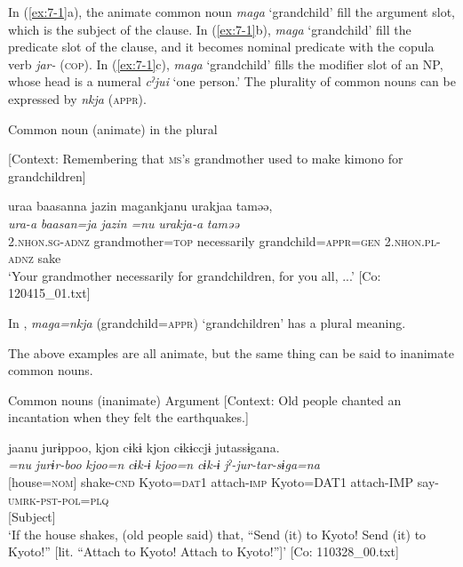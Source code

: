 \z
\z

In (\ref{ex:7-1}a), the animate common noun \textit{maga} ‘grandchild’ fill the argument slot, which is the subject of the clause. In (\ref{ex:7-1}b), \textit{maga} ‘grandchild’ fill the predicate slot of the clause, and it becomes nominal predicate with the copula verb \textit{jar-} (\textsc{cop}). In (\ref{ex:7-1}c), \textit{maga} ‘grandchild’ fills the modifier slot of an NP, whose head is a numeral \textit{cˀjui} ‘one person.’ The plurality of common nouns can be expressed by \textit{nkja} (\textsc{appr}).

\ea \label{ex:7:2}  Common noun (animate) in the plural

  [Context: Remembering that \textsc{ms}’s grandmother used to make kimono for grandchildren]

{\TM}
\glll uraa  baasanna  jazin  magankjanu urakjaa  taməə,\\
\textit{ura-a}  \textit{baasan=ja}  \textit{jazin}  \textit{=nu}   \textit{urakja-a}  \textit{taməə}\\
    2.\textsc{nhon}.\textsc{sg}-\textsc{adnz}  grandmother=\textsc{top}  necessarily  grandchild=\textsc{appr}=\textsc{gen}  2.\textsc{nhon}.\textsc{pl}-\textsc{adnz}  sake\\
\glt    ‘Your grandmother necessarily for grandchildren, for you all, ...’ [Co: 120415\_01.txt]

\z

In , \textit{maga=nkja} (grandchild=\textsc{appr}) ‘grandchildren’ has a plural meaning.

  The above examples are all animate, but the same thing can be said to inanimate common nouns.

\ea \label{ex:7:3}  Common nouns (inanimate)
\ea \label{ex:7:3a}Argument
    [Context: Old people chanted an incantation when they felt the earthquakes.]

{\TM}
\gllll  jaanu  jurɨppoo,  kjon  cɨkɨ  kjon   cɨkɨccjɨ  jutassɨgana.\\
\textit{=nu}  \textit{jurɨr-boo}  \textit{kjoo=n}  \textit{cɨk-ɨ}  \textit{kjoo=n}   \textit{cɨk-ɨ}  \textit{jˀ-jur-tar-sɨga=na}\\
{}[house=\textsc{nom}]  shake-\textsc{cnd}  Kyoto=\textsc{dat}1  attach-\textsc{imp}  Kyoto=DAT1  attach-IMP  say-\textsc{umrk}-\textsc{pst}-\textsc{pol}=\textsc{plq}\\
{}[Subject]        \\
\glt ‘If the house shakes, (old people said) that, “Send (it) to Kyoto! Send (it) to Kyoto!” [lit. “Attach to Kyoto! Attach to Kyoto!”]’ [Co: 110328\_00.txt]

